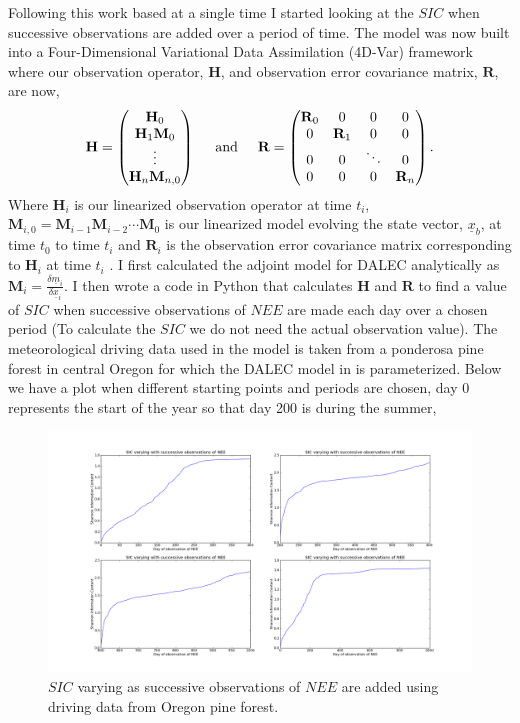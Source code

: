 \documentclass[11pt]{article}
\begin{document}
Following this work based at a single time I started looking at the $SIC$ when successive observations are added over a period of time. The model was now built into a Four-Dimensional Variational Data Assimilation (4D-Var) framework where our observation operator, $\textbf{H}$, and observation error covariance matrix, $\textbf{R}$, are now,
\[ 
\textbf{H}=
\begin{pmatrix}
\textbf{H}_0 \\
\textbf{H}_1\textbf{M}_0\\
\vdots \\
\textbf{H}_n\textbf{M}_{n,0}
\end{pmatrix}
\hspace{5mm} \text{and} \hspace{5mm}
\textbf{R}=
\begin{pmatrix}
\textbf{R}_0 & 0 & 0 & 0 \\
0 & \textbf{R}_1 & 0 & 0 \\
0 & 0 & \ddots & 0 \\
0 & 0 & 0 & \textbf{R}_n
\end{pmatrix}.
\]
Where $\textbf{H}_i$ is our linearized observation operator at time $t_i$, $\textbf{M}_{i,0}=\textbf{M}_{i-1}\textbf{M}_{i-2}\cdots\textbf{M}_0$ is our linearized model evolving the state vector, $\underline{x}_b$, at time $t_0$ to time $t_i$ and $\textbf{R}_i$ is the observation error covariance matrix corresponding to $\textbf{H}_i$ at time $t_i$ \cite{lewis2006dynamic}. I first calculated the adjoint model for DALEC analytically as $\textbf{M}_i=\frac{\delta \underline{m}_i}{\delta \underline{x}_i}$. I then wrote a code in Python that calculates $\textbf{H}$ and $\textbf{R}$ to find a value of $SIC$ when successive observations of $NEE$ are made each day over a chosen period (To calculate the $SIC$ we do not need the actual observation value). The meteorological driving data used in the model is taken from a ponderosa pine forest in central Oregon for which the DALEC model in \cite{williams2005improved} is parameterized. Below we have a plot when different starting points and periods are chosen, day 0 represents the start of the year so that day 200 is during the summer,
\begin{figure}[h!]
\centering
\includegraphics[width=1\textwidth]{SICsubplot.png}
\caption{$SIC$ varying as successive observations of $NEE$ are added using driving data from Oregon pine forest.}
\label{fig:SIC_subplot}
\end{figure}





{}

\end{document}
